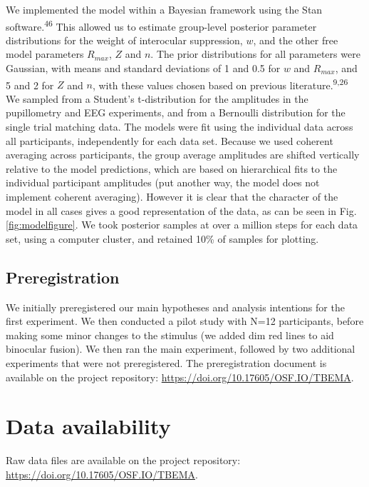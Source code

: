 \documentclass[
]{article}
\begin{document}
We implemented the model within a Bayesian framework using the Stan software.\textsuperscript{46} This allowed us to estimate group-level posterior parameter distributions for the weight of interocular suppression, \(w\), and the other free model parameters \(R_{max}\), \(Z\) and \(n\). The prior distributions for all parameters were Gaussian, with means and standard deviations of 1 and 0.5 for \(w\) and \(R_{max}\), and 5 and 2 for \(Z\) and \(n\), with these values chosen based on previous literature.\textsuperscript{9,26} We sampled from a Student's t-distribution for the amplitudes in the pupillometry and EEG experiments, and from a Bernoulli distribution for the single trial matching data. The models were fit using the individual data across all participants, independently for each data set. Because we used coherent averaging across participants, the group average amplitudes are shifted vertically relative to the model predictions, which are based on hierarchical fits to the individual participant amplitudes (put another way, the model does not implement coherent averaging). However it is clear that the character of the model in all cases gives a good representation of the data, as can be seen in Fig. \ref{fig:modelfigure}. We took posterior samples at over a million steps for each data set, using a computer cluster, and retained 10\% of samples for plotting.

\hypertarget{preregistration}{%
\subsection{Preregistration}\label{preregistration}}

We initially preregistered our main hypotheses and analysis intentions for the first experiment. We then conducted a pilot study with N=12 participants, before making some minor changes to the stimulus (we added dim red lines to aid binocular fusion). We then ran the main experiment, followed by two additional experiments that were not preregistered. The preregistration document is available on the project repository: \url{https://doi.org/10.17605/OSF.IO/TBEMA}.

\hypertarget{data-availability}{%
\section{Data availability}\label{data-availability}}

Raw data files are available on the project repository: \url{https://doi.org/10.17605/OSF.IO/TBEMA}.
\end{document}

